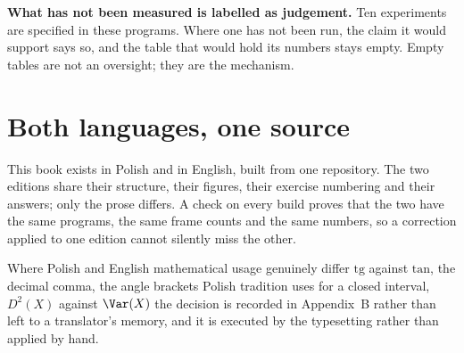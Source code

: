 \begin{note}
\textbf{What has not been measured is labelled as judgement.} Ten experiments
are specified in these programs. Where one has not been run, the claim it would
support says so, and the table that would hold its numbers stays empty. Empty
tables are not an oversight; they are the mechanism.
\end{note}

\section*{Both languages, one source}

This book exists in Polish and in English, built from one repository. The two
editions share their structure, their figures, their exercise numbering and
their answers; only the prose differs. A check on every build proves that the
two have the same programs, the same frame counts and the same numbers, so a
correction applied to one edition cannot silently miss the other.

Where Polish and English mathematical usage genuinely differ \dash{} $\mathrm{tg}$ against
$\mathrm{tan}$, the decimal comma, the angle brackets Polish tradition uses for a
closed interval, $D^2(X)$ against $\Var(X)$ \dash{} the decision is recorded in
Appendix~B rather than left to a translator's memory, and it is executed by the
typesetting rather than applied by hand.
